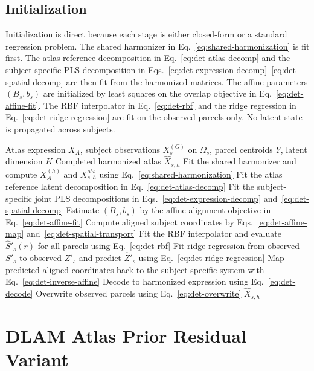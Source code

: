 \documentclass[11pt]{article}
\numberwithin{equation}{section}
\begin{document}
\subsection{Initialization}
Initialization is direct because each stage is either closed-form or a standard
regression problem.  The shared harmonizer in Eq.~\eqref{eq:shared-harmonization} is
fit first.  The atlas reference decomposition in Eq.~\eqref{eq:det-atlas-decomp} and
the subject-specific PLS decomposition in
Eqs.~\eqref{eq:det-expression-decomp}--\eqref{eq:det-spatial-decomp} are then fit
from the harmonized matrices.  The affine parameters $(B_s,b_s)$ are initialized by
least squares on the overlap objective in Eq.~\eqref{eq:det-affine-fit}.  The RBF
interpolator in Eq.~\eqref{eq:det-rbf} and the ridge regression in
Eq.~\eqref{eq:det-ridge-regression} are fit on the observed parcels only.  No latent
state is propagated across subjects.

\begin{algorithm}[H]
\caption{Deterministic alignment for subject $s$}
\begin{algorithmic}[1]
\Require Atlas expression $X_A$, subject observations $X_s^{(G)}$ on $\Omega_s$,
         parcel centroids $Y$, latent dimension $K$
\Ensure Completed harmonized atlas $\hat{X}_{s,h}$
\State Fit the shared harmonizer and compute $X_A^{(h)}$ and $X_{s,h}^{obs}$
       using Eq.~\eqref{eq:shared-harmonization}
\State Fit the atlas reference latent decomposition in Eq.~\eqref{eq:det-atlas-decomp}
\State Fit the subject-specific joint PLS decompositions in
       Eqs.~\eqref{eq:det-expression-decomp} and~\eqref{eq:det-spatial-decomp}
\State Estimate $(B_s,b_s)$ by the affine alignment objective in
       Eq.~\eqref{eq:det-affine-fit}
\State Compute aligned subject coordinates by Eqs.~\eqref{eq:det-affine-map}
       and~\eqref{eq:det-spatial-transport}
\State Fit the RBF interpolator and evaluate $\hat{S}'_s(r)$ for all parcels
       using Eq.~\eqref{eq:det-rbf}
\State Fit ridge regression from observed $S'_s$ to observed $Z'_s$ and predict
       $\hat{Z}'_s$ using Eq.~\eqref{eq:det-ridge-regression}
\State Map predicted aligned coordinates back to the subject-specific system with
       Eq.~\eqref{eq:det-inverse-affine}
\State Decode to harmonized expression using Eq.~\eqref{eq:det-decode}
\State Overwrite observed parcels using Eq.~\eqref{eq:det-overwrite}
\State \Return $\hat{X}_{s,h}$
\end{algorithmic}
\end{algorithm}

\section{DLAM Atlas Prior Residual Variant}
\label{sec:dlam-tprior}
\end{document}
